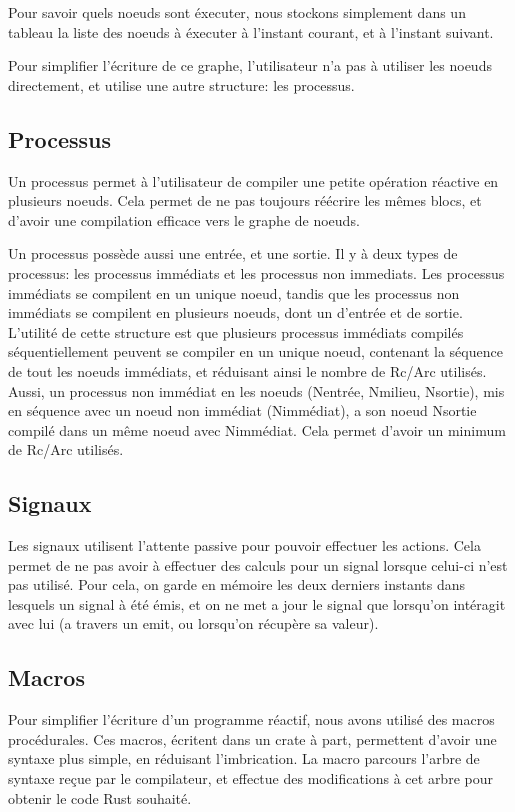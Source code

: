 \documentclass[a4paper]{article}
\renewcommand{\(}{\left(}
\renewcommand{\)}{\right)}
\begin{document}
Pour savoir quels noeuds sont éxecuter, nous stockons simplement dans un tableau
la liste des noeuds à éxecuter à l'instant courant, et à l'instant suivant.

Pour simplifier l'écriture de ce graphe, l'utilisateur n'a pas à utiliser les
noeuds directement, et utilise une autre structure: les processus.

\subsection{Processus}
Un processus permet à l'utilisateur de compiler une petite opération
réactive en plusieurs noeuds. Cela permet de ne pas toujours réécrire les mêmes
blocs, et d'avoir une compilation efficace vers le graphe de noeuds.

Un processus possède aussi une entrée, et une sortie. Il y à deux types de
processus: les processus immédiats et les processus non immediats. Les processus
immédiats se compilent en un unique noeud, tandis que les processus non
immédiats se compilent en plusieurs noeuds, dont un d'entrée et de sortie.
L'utilité de cette structure est que plusieurs processus immédiats compilés
séquentiellement peuvent se compiler en un unique noeud, contenant la séquence
de tout les noeuds immédiats, et réduisant ainsi le nombre de Rc/Arc utilisés.
Aussi, un processus non immédiat en les noeuds (Nentrée, Nmilieu,
Nsortie), mis en séquence avec un noeud non immédiat (Nimmédiat), a son noeud
Nsortie compilé dans un même noeud avec Nimmédiat. Cela permet d'avoir un
minimum de Rc/Arc utilisés.

\subsection{Signaux}

Les signaux utilisent l'attente passive pour pouvoir effectuer les actions. Cela
permet de ne pas avoir à effectuer des calculs pour un signal lorsque celui-ci
n'est pas utilisé. Pour cela, on garde en mémoire les deux derniers instants
dans lesquels un signal à été émis, et on ne met a jour le signal que lorsqu'on
intéragit avec lui (a travers un emit, ou lorsqu'on récupère sa valeur).

\subsection{Macros}

Pour simplifier l'écriture d'un programme réactif, nous avons utilisé des macros
procédurales. Ces macros, écritent dans un crate à part, permettent d'avoir une
syntaxe plus simple, en réduisant l'imbrication. La macro parcours l'arbre de
syntaxe reçue par le compilateur, et effectue des modifications à cet arbre pour
obtenir le code Rust souhaité.
\end{document}
